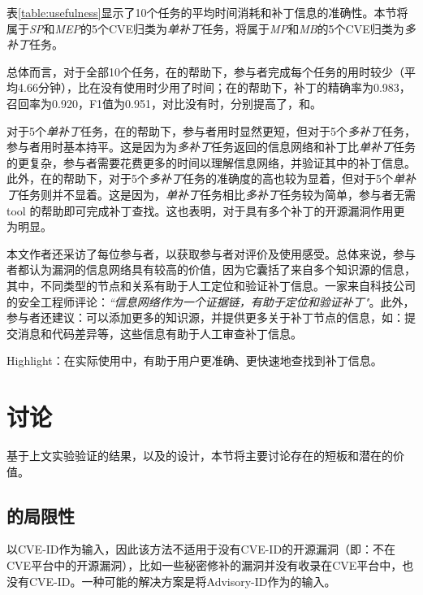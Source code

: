 表\ref{table:usefulness}显示了10个任务的平均时间消耗和补丁信息的准确性。本节将属于\textit{SP}和\textit{MEP}的5个CVE归类为\textit{单补丁}任务，将属于\textit{MP}和\textit{MB}的5个CVE归类为\textit{多补丁}任务。

总体而言，对于全部10个任务，在\tool 的帮助下，参与者完成每个任务的用时较少（平均4.66分钟），比在没有使用\tool 时少用了时间；在\tool 的帮助下，补丁的精确率为0.983，召回率为0.920，F1值为0.951，对比没有\tool 时，分别提高了，和。

对于5个\textit{单补丁}任务，在\tool 的帮助下，参与者用时显然更短，但对于5个\textit{多补丁}任务，参与者用时基本持平。这是因为\tool 为\textit{多补丁}任务返回的信息网络和补丁比\textit{单补丁}任务的更复杂，参与者需要花费更多的时间以理解信息网络，并验证其中的补丁信息。此外，在\tool 的帮助下，对于5个\textit{多补丁}任务的准确度的高也较为显着，但对于5个\textit{单补丁}任务则并不显着。这是因为，\textit{单补丁}任务相比\textit{多补丁}任务较为简单，参与者无需tool 的帮助即可完成补丁查找。这也表明，\tool 对于具有多个补丁的开源漏洞作用更为明显。

本文作者还采访了每位参与者，以获取参与者对\tool 评价及使用感受。总体来说，参与者都认为漏洞的信息网络具有较高的价值，因为它囊括了来自多个知识源的信息，其中，不同类型的节点和关系有助于人工定位和验证补丁信息。一家来自科技公司的安全工程师评论：\textit{``信息网络作为一个证据链，有助于定位和验证补丁"}。此外，参与者还建议：\tool 可以添加更多的知识源，并提供更多关于补丁节点的信息，如：提交消息和代码差异等，这些信息有助于人工审查补丁信息。

\begin{tcolorbox}[size=title,opacityfill=0.15]
Highlight：在实际使用中，\tool 有助于用户更准确、更快速地查找到补丁信息。
\end{tcolorbox}

\section{讨论}

基于上文实验验证的结果，以及\tool 的设计，本节将主要讨论\tool 存在的短板和潜在的价值。
\subsection{\tool 的局限性}
\tool 以CVE-ID作为输入，因此该方法不适用于没有CVE-ID的开源漏洞（即：不在CVE平台中的开源漏洞），比如一些秘密修补的漏洞并没有收录在CVE平台中，也没有CVE-ID。一种可能的解决方案是将Advisory-ID作为\tool 的输入。

